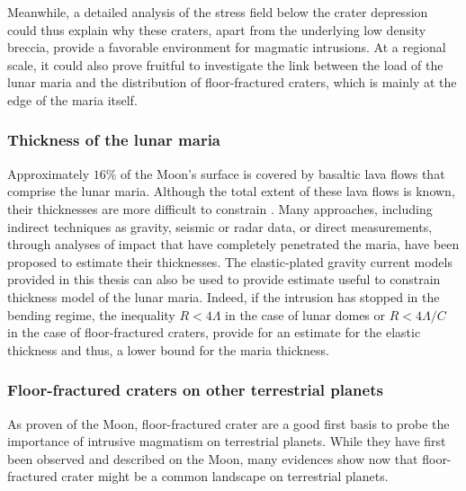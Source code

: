 Meanwhile, a  detailed analysis  of the stress  field below  the crater
depression  could  thus explain  why  these  craters, apart  from  the
underlying low  density breccia,  provide a favorable  environment for
magmatic  intrusions.   At  a  regional scale,  it  could  also  prove
fruitful to investigate  the link between the load of  the lunar maria
and the  distribution of floor-fractured  craters, which is  mainly at
the edge of the maria itself.

\subsubsection*{Thickness of the lunar maria}
\label{sec:crust-magm-intr}

Approximately $16\%$ of the Moon's surface is covered by basaltic lava
flows  that comprise  the lunar  maria. Although  the total  extent of
these lava  flows is  known, their thicknesses  are more  difficult to
constrain \citep{Thomson:2009eo}. Many approaches, including
indirect  techniques as  gravity,  seismic or  radar  data, or  direct
measurements,  through   analyses  of  impact  that   have  completely
penetrated   the  maria,   have  been   proposed  to   estimate  their
thicknesses.  The  elastic-plated gravity  current models  provided in
this thesis can  also be used to provide estimate  useful to constrain
thickness model of the lunar maria.  Indeed, if the intrusion has stopped
in the  bending regime, the  inequality $R<  4\Lambda$ in the  case of
lunar domes or $R<4\Lambda/C$ in  the case of floor-fractured craters,
provide for  an estimate for the  elastic thickness and thus,  a lower
bound for the maria thickness.

\subsubsection*{Floor-fractured craters on other terrestrial planets}

As proven of  the Moon, floor-fractured crater are a  good first basis
to probe the importance of intrusive magmatism on terrestrial planets.
While they  have first been observed  and described on the  Moon, many
evidences  show now  that  floor-fractured crater  might  be a  common
landscape on terrestrial planets.

